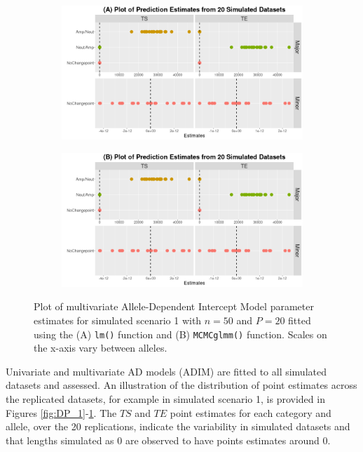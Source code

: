 \begin{figure}[H]
\vspace{0.5cm}
     \begin{subfigure}[t]{.49\textwidth}
      \centering
     \includegraphics[width = 1\textwidth]{../figures/Chapter_5/Multi_lm_Prediction_Simulation.png}
    \end{subfigure}%
     \begin{subfigure}[t]{.49\textwidth}
      \centering
       \includegraphics[width = 1\textwidth]{../figures/Chapter_5/Multi_MCMC_Prediction_Simulation.png}
    \end{subfigure} 
     \caption[Plot of multivariate Allele-Dependent Intercept Model parameter estimates for simulated scenario 1 with $n = 50$ and $P = 20$.]{Plot of multivariate Allele-Dependent Intercept Model parameter estimates for simulated scenario 1 with $n = 50$ and $P = 20$ fitted using the (A) \texttt{lm()} function and (B) \texttt{MCMCglmm()} function. Scales on the x-axis vary between alleles.}
     \label{fig:DP_2}
\end{figure}

Univariate and multivariate AD models (ADIM) are fitted to all simulated datasets and assessed. An illustration of the distribution of point estimates across the replicated datasets, for example in simulated scenario 1, is provided in Figures \ref{fig:DP_1}-\ref{fig:DP_2}. The $TS$ and $TE$ point estimates for each category and allele, over the 20 replications, indicate the variability in simulated datasets and that lengths simulated as 0 are observed to have points estimates around 0.

